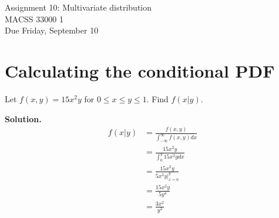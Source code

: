 \documentclass[12pt]{article}
\begin{document}
	\begin{center}
		Assignment 10: Multivariate distribution\\
        MACSS 33000 1 \\
		Due Friday, September 10 \\
	\end{center}

\section{Calculating the conditional PDF}
Let $f(x,y)=15x^2y$ for $0\leq x\leq y\leq 1$. Find $f(x|y)$.

\textbf{Solution.}
\begin{align*}
    f(x|y) &= \frac{f(x,y)}{\int_{-\infty}^\infty f(x,y)dx}
    \\ &= \frac{15x^2y}{\int_0^y 15x^2y dx}
    \\ &= \frac{15x^2y}{5x^3y \bigg|_{x=0}^y}
    \\ &= \frac{15x^2y}{5y^4}
    \\ &= \frac{3x^2}{y^3}
\end{align*}
\end{document}
